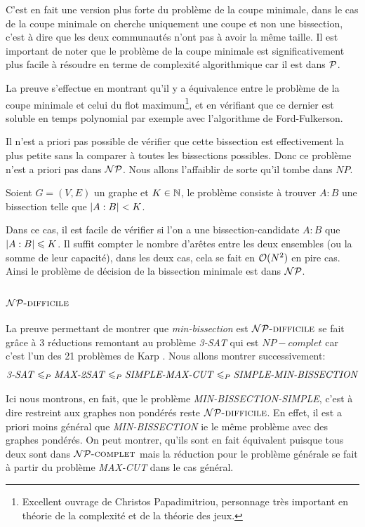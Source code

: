 \documentclass{standalone}
\begin{document}
\begin{rem}
	C'est en fait une version plus forte du problème de la coupe minimale, dans le cas de la coupe minimale on cherche uniquement une coupe et non une bissection, c'est à dire que les deux communautés n'ont pas à avoir la même taille. Il est important de noter que le problème de la coupe minimale est significativement plus facile à résoudre en terme de complexité algorithmique car il est dans $\PP$.
	
	La preuve s'effectue en montrant qu'il y a équivalence entre le problème de la coupe minimale et celui du flot maximum\cite{papadimitriou1982combinatorial}\footnote{Excellent ouvrage de Christos Papadimitriou, personnage très important en théorie de la complexité et de la théorie des jeux.}, et en vérifiant que ce dernier est soluble en temps polynomial par exemple avec l'algorithme de Ford-Fulkerson.
\end{rem}

Il n'est a priori pas possible de vérifier que cette bissection est effectivement la plus petite sans la comparer à toutes les bissections possibles. Donc ce problème n'est a priori pas dans $\NP$. Nous allons l'affaiblir de sorte qu'il tombe dans $NP$.
\begin{defn}
	Soient $G=(V, E)$ un graphe et $K \in \N$, le problème consiste à trouver $A:B$ une bissection telle que $\card{A:B} < K$.
\end{defn}
Dans ce cas, il est facile de vérifier si l'on a une bissection-candidate $A:B$ que $\card{A:B} \leq K$. Il suffit compter le nombre d'arêtes entre les deux ensembles (ou la somme de leur capacité), dans les deux cas, cela se fait en $\Orond(N^2)$ en pire cas. Ainsi le problème de décision de la bissection minimale est  dans $\NP$.

\subsubsection{$\NPHARD$}

La preuve permettant de montrer que \textit{min-bissection} est $\NPHARD$ se fait grâce à 3 réductions remontant au problème \textit{3-SAT} qui est $NP-complet$ car c'est l'un des 21 problèmes de Karp \cite{21karp}. Nous allons montrer successivement:
\[ \text{\textit{3-SAT}} \leq_P \text{\textit{MAX-2SAT}} \leq_P \text{\textit{SIMPLE-MAX-CUT}} \leq_P \text{\textit{SIMPLE-MIN-BISSECTION}} \]

\begin{rem}
	Ici nous montrons, en fait, que le problème \textit{MIN-BISSECTION-SIMPLE}, c'est à dire restreint aux graphes non pondérés reste $\NPHARD$. En effet, il est a priori moins général que \textit{MIN-BISSECTION} ie le même problème avec des graphes pondérés. On peut montrer, qu'ils sont en fait équivalent puisque tous deux sont dans $\NPCOMPLETE$ mais la réduction pour le problème générale se fait à partir du problème \textit{MAX-CUT} dans le cas général.
\end{rem}
\end{document}
